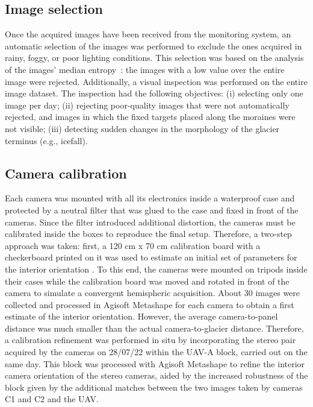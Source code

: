 \subsection{Image selection}\label{sec:4:imageselection}

Once the acquired images have been received from the monitoring system, an automatic selection of the images was performed to exclude the ones acquired in rainy,
foggy, or poor lighting conditions. 
This selection was based on the analysis of the images' median entropy~\citep{tsai2008entropy}:
the images with a low value over the entire image were rejected.
Additionally, a visual inspection was performed on the entire image dataset.
The inspection had the following objectives:
(i) selecting only one image per day;
(ii) rejecting poor-quality images that were not automatically rejected,
and images in which the fixed targets placed along the moraines were not visible;
(iii) detecting sudden changes in the morphology of the glacier terminus (e.g., icefall).

\subsection{Camera calibration}\label{sec:4:cameracalibration}

Each camera was mounted with all its electronics inside a waterproof case and protected by a neutral filter that was glued to the case and fixed in front of the cameras.
Since the filter introduced additional distortion, the cameras must be calibrated inside the boxes to reproduce the final setup.
Therefore, a two-step approach was taken: first, a 120 cm x 70 cm calibration board with a checkerboard printed on it was used to estimate an initial set of parameters for the interior orientation \citep{zhang_flexible_2000}.
To this end, the cameras were mounted on tripods inside their cases while the calibration board was moved and rotated in front of the camera to simulate a convergent hemispheric acquisition.
About 30 images were collected and processed in Agisoft Metashape for each camera to obtain a first estimate of the interior orientation.
However, the average camera-to-panel distance was much smaller than the actual camera-to-glacier distance.
Therefore, a calibration refinement was performed in situ by incorporating the stereo pair acquired by the cameras on 28/07/22 within the UAV-A block, carried out on the same day.
This block was processed with Agisoft Metashape to refine the interior camera orientation of the stereo cameras, aided by the increased robustness of the block given
by the additional matches between the two images taken by cameras C1 and C2 and the UAV.

